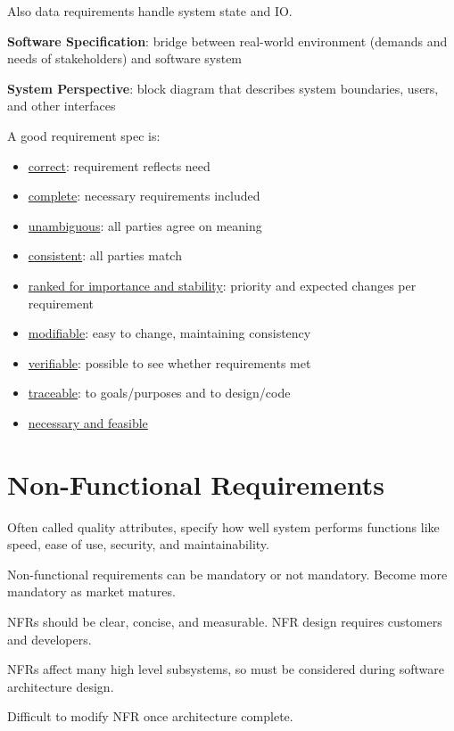 \documentclass[11pt]{article}
\begin{document}
Also data requirements handle system state and IO.

\textbf{Software Specification}: bridge between real-world environment (demands
and needs of stakeholders) and software system

\textbf{System Perspective}: block diagram that describes system boundaries, users,
and other interfaces

A good requirement spec is:
\begin{itemize}
\item \uline{correct}: requirement reflects need
\item \uline{complete}: necessary requirements included
\item \uline{unambiguous}: all parties agree on meaning
\item \uline{consistent}: all parties match
\item \uline{ranked for importance and stability}: priority and expected changes per
requirement
\item \uline{modifiable}: easy to change, maintaining consistency
\item \uline{verifiable}: possible to see whether requirements met
\item \uline{traceable}: to goals/purposes and to design/code
\item \uline{necessary and feasible}
\end{itemize}
\section{Non-Functional Requirements}
\label{sec:org925df67}
Often called quality attributes, specify how well system performs functions like
speed, ease of use, security, and maintainability.

Non-functional requirements can be mandatory or not mandatory.
Become more mandatory as market matures.

NFRs should be clear, concise, and measurable.
NFR design requires customers and developers.

NFRs affect many high level subsystems, so must be considered during software
architecture design.

Difficult to modify NFR once architecture complete.
\end{document}
